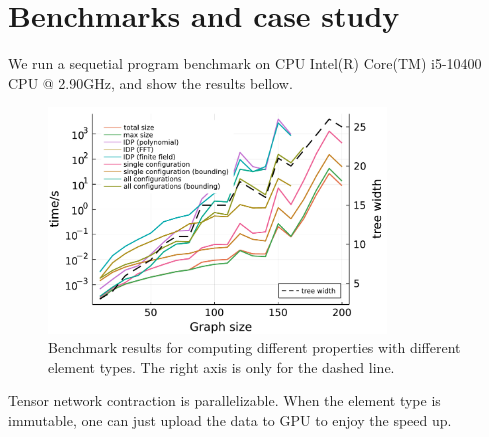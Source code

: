 \documentclass[review,onefignum,onetabnum]{siamart190516}
\newcommand{\<}{\langle}
\renewcommand{\>}{\rangle}
\begin{document}
\section{Benchmarks and case study}
We run a sequetial program benchmark on CPU Intel(R) Core(TM) i5-10400 CPU @ 2.90GHz, and show the results bellow.
\begin{figure}
    \centering
    \includegraphics[width=0.8\textwidth, trim={0cm 0cm 0cm 0cm}, clip]{benchmark.pdf}
    \caption{Benchmark results for computing different properties with different element types.
The right axis is only for the dashed line.
    }\label{fig:benchmark}
\end{figure}
Tensor network contraction is parallelizable. When the element type is immutable, one can just upload the data to GPU to enjoy the speed up.
\end{document}
